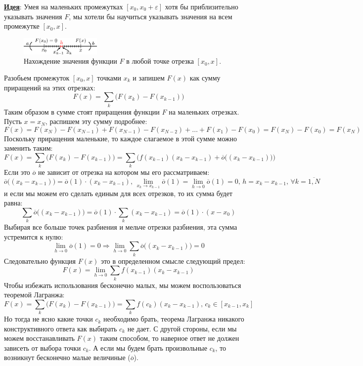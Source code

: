 \documentclass[12pt]{article}
\newcommand{\VE}{\varepsilon}
\theoremstyle{definition}
\begin{document}
\textbf{\uline{Идея}}: Умея на маленьких промежутках $[x_0,x_0 + \VE]$ хотя бы приблизительно указывать значения $F$, мы хотели бы научиться указывать значения на всем промежутке $[x_0, x]$.
\begin{figure}[H]
	\centering
	\includegraphics[width=0.35\textwidth]{21_1.eps}
	\caption{Нахождение значения функции $F$ в любой точке отрезка $[x_0,x]$.}
	\label{21_1}
\end{figure}
Разобьем промежуток $[x_0,x]$ точками $x_k$ и запишем $F(x)$ как сумму приращений на этих отрезках:
$$
	F(x) = \sum\limits_{k}\big(F(x_k) - F(x_{k-1})\big)
$$
Таким образом в сумме стоят приращения функции $F$ на маленьких отрезках. Пусть $x = x_N$, распишем эту сумму подробнее:
$$
	F(x) = F(x_N) - F(x_{N-1}) + F(x_{N-1}) - F(x_{N-2}) + \dotsc + F(x_1) - F(x_0) =  F(x_N) - F(x_0) = F(x_N) 
$$
Поскольку приращения маленькие, то каждое слагаемое в этой сумме можно заменить таким:
$$
	F(x) = \sum\limits_{k}\big(F(x_k) - F(x_{k-1})\big) = \sum\limits_{k}\Big(f(x_{k-1})(x_k - x_{k-1}) + \overline{o}\big((x_k - x_{k-1})\big) \Big)
$$
Если это $\overline{o}$ не зависит от отрезка на котором мы его рассматриваем:
$$
	\overline{o}\big((x_k - x_{k-1})\big) = \overline{o}(1){\cdot}(x_k - x_{k-1}), \, \lim\limits_{x_k \to x_{k-1}}\overline{o}(1) = \lim\limits_{h \to 0}\overline{o}(1) = 0, \, h = x_k - x_{k-1}, \, \forall k = \overline{1,N}
$$
и если мы можем его сделать единым для всех отрезков, то их сумма будет равна:
$$
	\sum\limits_k \overline{o}\big((x_k - x_{k-1})\big) = \overline{o}(1){\cdot} \sum\limits_k (x_k - x_{k-1}) = \overline{o}(1){\cdot}(x - x_0)
$$
Выбирая все больше точек разбиения и мельче отрезки разбиения, эта сумма устремится к нулю:
$$
	\lim\limits_{h \to 0}\overline{o}(1) = 0 \Rightarrow \lim\limits_{h \to 0}\sum\limits_k \overline{o}\big((x_k - x_{k-1})\big) = 0
$$
Следовательно функция $F(x)$ это в определенном смысле следующий предел:
$$
	F(x) = \lim\limits_{h \to 0}\sum\limits_{k}f(x_{k-1})(x_k - x_{k-1})
$$
\newpage
Чтобы избежать использования бесконечно малых, мы можем воспользоваться теоремой Лагранжа:
$$
	F(x) = \sum\limits_{k}\big(F(x_k) - F(x_{k-1})\big) = \sum\limits_{k}f(c_k)(x_k - x_{k-1}), \, c_k \in [x_{k-1}, x_k]
$$
Но тогда не ясно какие точки $c_k$ необходимо брать, теорема Лагранжа никакого конструктивного ответа как выбирать $c_k$ не дает. С другой стороны, если мы можем восстанавливать $F(x)$ таким способом, то наверное ответ не должен зависеть от выбора точки $c_k$. А если мы будем брать произвольные $c_k$, то возникнут бесконечно малые величиные ($\overline{o}$).
\end{document}
